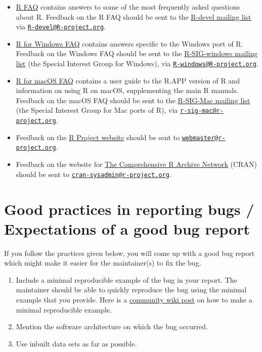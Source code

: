 \documentclass[
  letterpaper,
  DIV=11,
  numbers=noendperiod]{scrreprt}
\providecommand{\tightlist}{%
  \setlength{\itemsep}{0pt}\setlength{\parskip}{0pt}}\usepackage{longtable,booktabs,array}
\begin{document}
\begin{itemize}
\tightlist
\item
  \href{https://cran.r-project.org/doc/FAQ/R-FAQ.html}{R FAQ} contains
  answers to some of the most frequently asked questions about R.
  Feedback on the R FAQ should be sent to the
  \href{https://stat.ethz.ch/mailman/listinfo/r-devel}{R-devel mailing
  list} via
  \href{mailto:R-devel@R-project.org}{\nolinkurl{R-devel@R-project.org}}.
\item
  \href{https://cran.r-project.org/bin/windows/base/rw-FAQ.html}{R for
  Windows FAQ} contains answers specific to the Windows port of R.
  Feedback on the Windows FAQ should be sent to the
  \href{https://stat.ethz.ch/mailman/listinfo/r-sig-windows}{R-SIG-windows
  mailing list} (the Special Interest Group for Windows), via
  \href{mailto:R-windows@R-project.org}{\nolinkurl{R-windows@R-project.org}}.
\item
  \href{https://cran.r-project.org/bin/macosx/RMacOSX-FAQ.html}{R for
  macOS FAQ} contains a user guide to the R.APP version of R and
  information on using R on macOS, supplementing the main R manuals.
  Feedback on the macOS FAQ should be sent to the
  \href{https://stat.ethz.ch/mailman/listinfo/r-sig-mac}{R-SIG-Mac
  mailing list} (the Special Interest Group for Mac ports of R), via
  \href{mailto:r-sig-mac@r-project.org}{\nolinkurl{r-sig-mac@r-project.org}}.
\item
  Feedback on the \href{https://www.r-project.org/}{R Project website}
  should be sent to
  \href{mailto:webmaster@r-project.org}{\nolinkurl{webmaster@r-project.org}}.
\item
  Feedback on the website for \href{https://cran.r-project.org/}{The
  Comprehensive R Archive Network} (CRAN) should be sent to
  \href{mailto:cran-sysadmin@r-project.org}{\nolinkurl{cran-sysadmin@r-project.org}}.
\end{itemize}

\section{Good practices in reporting bugs / Expectations of a good bug
report}\label{good-practices-bugs}

If you follow the practices given below, you will come up with a good
bug report which might make it easier for the maintainer(s) to fix the
bug.

\begin{enumerate}
\def\labelenumi{\arabic{enumi}.}
\item
  Include a minimal reproducible example of the bug in your report. The
  maintainer should be able to quickly reproduce the bug using the
  minimal example that you provide. Here is a
  \href{https://stackoverflow.com/questions/5963269/how-to-make-a-great-r-reproducible-example}{community
  wiki post} on how to make a minimal reproducible example.
\item
  Mention the software architecture on which the bug occurred.
\item
  Use inbuilt data sets as far as possible.
\end{enumerate}
\end{document}
